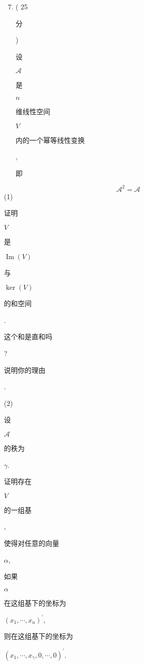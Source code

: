 \documentclass[10pt]{article}
\begin{document}
\begin{enumerate}
  \setcounter{enumi}{6}
  \item ( 25 \begin{CJK}{UTF8}{mj}分\end{CJK}) \begin{CJK}{UTF8}{mj}设\end{CJK} $\mathscr{A}$ \begin{CJK}{UTF8}{mj}是\end{CJK} $n$ \begin{CJK}{UTF8}{mj}维线性空间\end{CJK} $V$ \begin{CJK}{UTF8}{mj}内的一个幂等线性变换\end{CJK}, \begin{CJK}{UTF8}{mj}即\end{CJK}
\end{enumerate}
$$
\mathscr{A}^{2}=\mathscr{A}
$$
(1) \begin{CJK}{UTF8}{mj}证明\end{CJK} $V$ \begin{CJK}{UTF8}{mj}是\end{CJK} $\operatorname{Im}(V)$ \begin{CJK}{UTF8}{mj}与\end{CJK} $\operatorname{ker}(V)$ \begin{CJK}{UTF8}{mj}的和空间\end{CJK}. \begin{CJK}{UTF8}{mj}这个和是直和吗\end{CJK}? \begin{CJK}{UTF8}{mj}说明你的理由\end{CJK}.

(2) \begin{CJK}{UTF8}{mj}设\end{CJK} $\mathscr{A}$ \begin{CJK}{UTF8}{mj}的秩为\end{CJK} $\gamma$. \begin{CJK}{UTF8}{mj}证明存在\end{CJK} $V$ \begin{CJK}{UTF8}{mj}的一组基\end{CJK}, \begin{CJK}{UTF8}{mj}使得对任意的向量\end{CJK} $\alpha$, \begin{CJK}{UTF8}{mj}如果\end{CJK} $\alpha$ \begin{CJK}{UTF8}{mj}在这组基下的坐标为\end{CJK} $\left(x_{1}, \cdots, x_{n}\right)^{\prime}$, \begin{CJK}{UTF8}{mj}则在这组基下的坐标为\end{CJK} $\left(x_{1}, \cdots, x_{\gamma}, 0, \cdots, 0\right)^{\prime}$.
\end{document}
